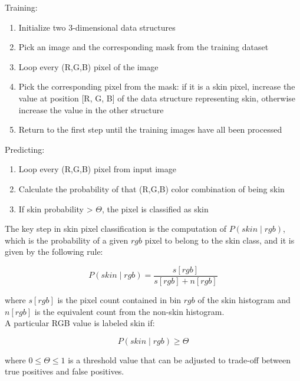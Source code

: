 \begin{minipage}{\linewidth}%
\noindent Training:
    \begin{enumerate}[Step 1:]
    \item Initialize two 3-dimensional data structures
    \item Pick an image and the corresponding mask from the training dataset
    \item Loop every (R,G,B) pixel of the image
    \item Pick the corresponding pixel from the mask: if it is a skin pixel, increase the value at position [R, G, B] of the data structure representing skin, otherwise increase the value in the other structure
    \item Return to the first step until the training images have all been processed 
    \end{enumerate}
    
    \vspace{3mm}
    \noindent Predicting:
    \begin{enumerate}[Step 1:]
    \item Loop every (R,G,B) pixel from input image
    \item Calculate the probability of that (R,G,B) color combination of being skin
    \item If skin probability > $\Theta$, the pixel is classified as skin
    \end{enumerate}
\end{minipage}

\vspace{7mm}
\noindent The key step in skin pixel classification is the computation of $P (skin \mid rgb)$, which is the probability of a given $rgb$ pixel to belong to the skin class, and it is given by the following rule:

\begin{equation}
    P(skin \mid rgb) = \frac{s[rgb]}{s[rgb] + n[rgb]}
\end{equation}

where $s[rgb]$ is the pixel count contained in bin $rgb$ of the skin histogram and $n[rgb]$ is the equivalent count from the non-skin histogram.\\
A particular RGB value is labeled skin if:

\begin{equation}
\label{eqn:bayes-thresh}
P(s k i n \mid r g b) \geq \Theta
\end{equation}

where  $0 \leq \Theta \leq 1 $ is a threshold value that can be adjusted to trade-off between true positives and false positives.

